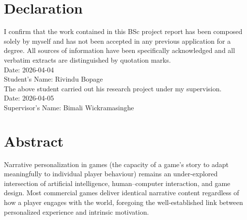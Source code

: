 \clearpage
{}
\clearpage
{}
\setcounter{page}{1}
\pagestyle{fancy}

\chapter*{Declaration}

I confirm that the work contained in this BSc project report has been composed solely by myself and has not been accepted in any previous application for a degree. All sources of information have been specifically acknowledged and all verbatim extracts are distinguished by quotation marks.\\[1cm]

\noindent Date: 2026-04-04 \\[0.5cm]
\noindent Student's Name: Rivindu Bopage \\[2cm]

\noindent The above student carried out his research project under my supervision.\\[1cm]

\noindent Date: 2026-04-05 \\[0.5cm]
\noindent Supervisor's Name: Bimali Wickramasinghe

\clearpage



\clearpage

\chapter*{Abstract}

Narrative personalization in games (the capacity of a game's story to adapt meaningfully to individual player behaviour) remains an under-explored intersection of artificial intelligence, human--computer interaction, and game design. Most commercial games deliver identical narrative content regardless of how a player engages with the world, foregoing the well-established link between personalized experience and intrinsic motivation.

